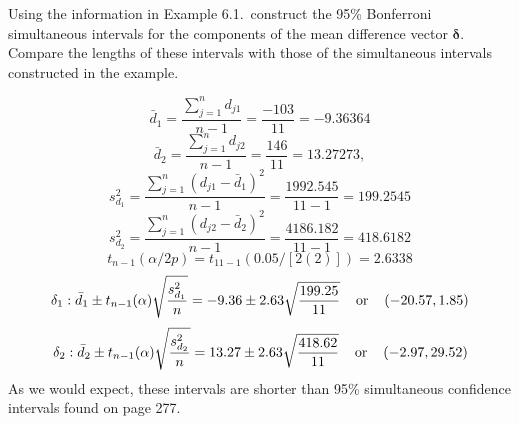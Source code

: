 Using the information in Example 6.1.\ construct the 95\% Bonferroni simultaneous intervals
for the components of the mean difference vector $\bm{\delta}$. Compare the lengths of
these intervals with those of the simultaneous intervals constructed in the example.

\[
    \bar{d}_{1}
    =
    \frac{ \sum_{j=1}^{n}{ d_{j1} } }{n-1}
    =
    \frac{-103}{11}
    =
    -9.36364
\]
\[
    \bar{d}_{2}
    =
    \frac{ \sum_{j=1}^{n}{ d_{j2} } }{n-1}
    =
    \frac{146}{11}
    =
    13.27273,
\]
\[
    s_{d_{1}}^{2}
    =
    \frac{ \sum_{j=1}^{n}{( d_{j1} - \bar{d}_{1} )}^{2} }{n-1}
    =
    \frac{1992.545}{11 - 1}
    =
    199.2545
\]
\[
    s_{d_{2}}^{2}
    =
    \frac{ \sum_{j=1}^{n}{( d_{j2} - \bar{d}_{2} )}^{2} }{n-1}
    =
    \frac{4186.182}{11 - 1}
    =
    418.6182
\]
\[
    t_{n-1}(\alpha/2p)
    =
    t_{11-1}(0.05/[2(2)])
    =
    2.6338
\]
\[
    \delta_{1}:
    \bar{d}_{1}
    \pm
    t_{n - 1}(\alpha)
    \sqrt{ \frac{ s_{d_{1}}^{2} }{n} }
    =
    -9.36
    \pm
    2.63
    \sqrt{ \frac{ 199.25 }{ 11 } }
    \hspace{0.4cm}\text{or}\hspace{0.4cm}
    (-20.57, 1.85)
\]
\[
    \delta_{2}:
    \bar{d}_{2}
    \pm
    t_{n - 1}(\alpha)
    \sqrt{ \frac{ s_{d_{2}}^{2} }{n} }
    =
    13.27
    \pm
    2.63
    \sqrt{ \frac{ 418.62 }{ 11 } }
    \hspace{0.4cm}\text{or}\hspace{0.4cm}
    (-2.97, 29.52)
\]
As we would expect, these intervals are shorter than 95\% simultaneous confidence intervals found on page 277.